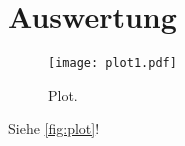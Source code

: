 \section{Auswertung}
\label{sec:Auswertung}

\begin{figure}
  \centering
  \texttt{[image: plot1.pdf]}
  \caption{Plot.}
  \label{fig:plot}
\end{figure}


Siehe \autoref{fig:plot}!
